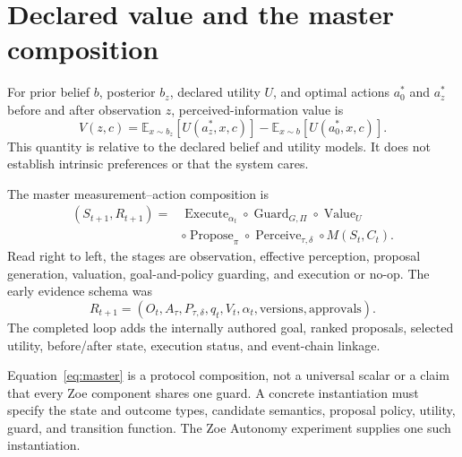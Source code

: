 \section{Declared value and the master composition}
For prior belief $b$, posterior $b_z$, declared utility $U$, and optimal actions $a_0^*$ and $a_z^*$ before and after observation $z$, perceived-information value is
\begin{equation}
V(z,c)=\mathbb E_{x\sim b_z}[U(a_z^*,x,c)]
-\mathbb E_{x\sim b}[U(a_0^*,x,c)].
\label{eq:information-value}
\end{equation}
This quantity is relative to the declared belief and utility models. It does not establish intrinsic preferences or that the system cares.

The master measurement--action composition is
\begin{equation}
\boxed{
\begin{aligned}
(S_{t+1},R_{t+1})={}&
\operatorname{Execute}_{\alpha_t}
\circ\operatorname{Guard}_{G,\Pi}
\circ\operatorname{Value}_{U}\\
&\circ\operatorname{Propose}_{\pi}
\circ\operatorname{Perceive}_{\tau,\delta}
\circ M(S_t,C_t).
\end{aligned}}
\label{eq:master}
\end{equation}
Read right to left, the stages are observation, effective perception, proposal generation, valuation, goal-and-policy guarding, and execution or no-op. The early evidence schema was
\begin{equation}
R_{t+1}=(O_t,A_\tau,P_{\tau,\delta},q_t,V_t,\alpha_t,
\text{versions},\text{approvals}).
\label{eq:protocol-record}
\end{equation}
The completed loop adds the internally authored goal, ranked proposals, selected utility, before/after state, execution status, and event-chain linkage.

Equation~\eqref{eq:master} is a protocol composition, not a universal scalar or a claim that every Zoe component shares one guard. A concrete instantiation must specify the state and outcome types, candidate semantics, proposal policy, utility, guard, and transition function. The Zoe Autonomy experiment supplies one such instantiation.

